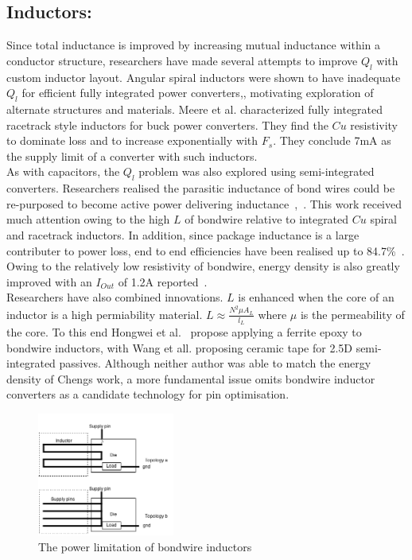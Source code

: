 \documentclass[letterpaper,twocolumn,10pt]{article}
\begin{document}
\subsection{Inductors: }Since total inductance is improved by increasing mutual inductance within a conductor structure, researchers have made several attempts to improve $Q_l$ with custom inductor layout. Angular spiral inductors were shown to have inadequate $Q_l$ for efficient fully integrated power converters\cite{Alimadadi2008},\cite{Artillan2011}, motivating exploration of alternate structures and materials. Meere et al. \cite{Meere2009} characterized fully integrated racetrack style inductors for buck power converters. They find the $Cu$ resistivity to dominate loss and to increase exponentially with $F_s$. They conclude 7mA as the supply limit of a converter with such inductors.\\
As with capacitors, the $Q_l$ problem was also explored using semi-integrated converters. Researchers realised the parasitic inductance of bond wires could be re-purposed to become active power delivering inductance~\cite{Wens2007},~\cite{Ahn2012}. This work received much attention owing to the high $L$ of bondwire relative to integrated $Cu$ spiral and racetrack inductors. In addition, since package inductance is a large contributer to power loss, end to end efficiencies have been realised up to 84.7\%~\cite{Cheng2013}. Owing to the relatively low resistivity of bondwire, energy density is also greatly improved with an $I_{Out}$ of 1.2A reported~\cite{Cheng2013}.\\
\indent Researchers have also combined innovations. $L$ is enhanced when the core of an inductor is a high permiability material. $L \approx \frac{N^2\mu A_L}{l_L}$ where $\mu$ is the permeability of the core. To this end Hongwei et al.~\cite{Hongwei2011} propose applying a ferrite epoxy to bondwire inductors, with Wang et all. proposing ceramic tape for 2.5D semi-integrated passives. Although neither author was able to match the energy density of Chengs work, a more fundamental issue omits bondwire inductor converters as a candidate technology for pin optimisation.
    
\begin{figure}[here]
\includegraphics[width=0.4\textwidth]{CostvsGainofBondWireInductor}
\caption{The power limitation of bondwire inductors}
\label{BondWireLim}
\end{figure}
\end{document}
